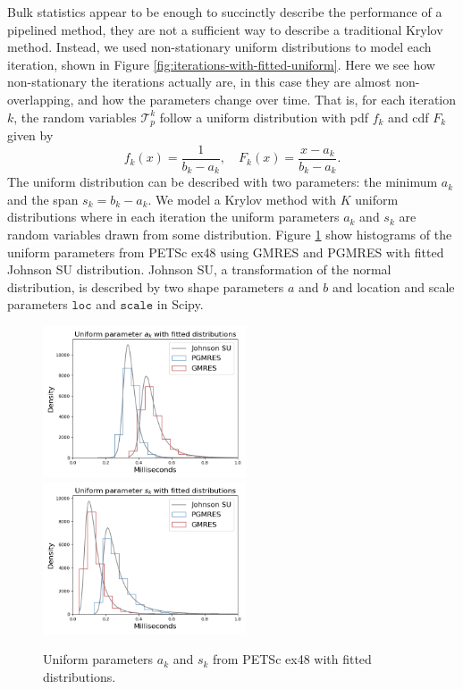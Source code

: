 \documentclass[sigconf, anonymous]{acmart}
\begin{document}
Bulk statistics appear to be enough to succinctly describe the performance of a pipelined method, they are not a sufficient way to describe a traditional Krylov method. Instead, we used non-stationary uniform distributions to model each iteration, shown in Figure \ref{fig:iterations-with-fitted-uniform}.
Here we see how non-stationary the iterations actually are, in this case they are almost non-overlapping, and how the parameters change over time. 
That is, for each iteration $k$, the random variables $\mathcal{T}_p^k$ follow a uniform distribution with pdf $f_k$ and cdf $F_k$ given by
\begin{equation} \label{eq:uniform}
f_k(x) = \frac{1}{b_k - a_k}, \quad F_k(x) = \frac{x-a_k}{b_k-a_k}.
\end{equation}
The uniform distribution can be described with two parameters: the minimum $a_k$ and the span $s_k = b_k - a_k$. We model a Krylov method with $K$ uniform distributions
where in each iteration the uniform parameters $a_k$ and $s_k$ are random variables drawn from some distribution. 
Figure \ref{fig:uniform-params-fitted} show histograms of the uniform parameters from  PETSc ex48 using GMRES and PGMRES with fitted Johnson SU distribution.
Johnson SU, a transformation of the normal distribution, is described by two shape parameters $a$ and $b$ and location and scale parameters ${\texttt{loc}}$ and ${\texttt{scale}}$ in Scipy.  

\begin{figure}[t]
\centering
\includegraphics[width=6cm]{../plots/GMRES_PGMRES_ex48_8192_1000000_uniform_a_k_with_johnsonsu.png}
\includegraphics[width=6cm]{../plots/GMRES_PGMRES_ex48_8192_1000000_uniform_s_k_with_johnsonsu.png} 
\caption{Uniform parameters $a_k$ and $s_k$ from PETSc ex48 with fitted distributions.} \label{fig:uniform-params-fitted}
\end{figure}
\end{document}
